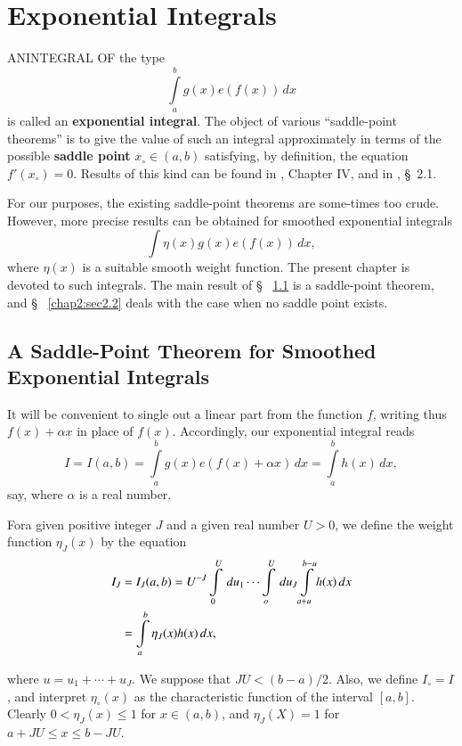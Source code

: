 \chapter{Exponential Integrals}\label{chap2}

AN\pageoriginale INTEGRAL OF the type
$$
\int\limits_a^bg(x)e(f(x))\,dx
$$
is called an {\bf exponential integral}. The object of various
``saddle-point theorems'' is to give the value of such an integral
approximately in terms of the possible {\bf saddle point} $x_\circ
\in(a,b)$ satisfying, by definition, the equation
$f'(x_\circ)=0$. Results of this kind can be found \eg in
\cite{key27}, Chapter IV, and in \cite{key13}, \S~2.1.

For our purposes, the existing saddle-point theorems are some-times
too crude. However, more precise results can be obtained for smoothed
exponential integrals
$$
\int\eta(x)g(x)e(f(x))\,dx,
$$
where $\eta(x)$ is a suitable smooth weight function. The present
chapter is devoted to such integrals. The main result of \S~
\ref{chap2:sec2.1} is a saddle-point theorem, and \S~
\ref{chap2:sec2.2} deals with the case when no saddle point exists.

\section[A Saddle-Point Theorem for]{A Saddle-Point Theorem for
  Smoothed Exponential Integrals}\label{chap2:sec2.1} 

It will be convenient to single out a linear part from the function
$f$, writing thus $f(x)+\alpha x$ in place of $f(x)$. Accordingly, our
exponential integral reads
\begin{equation}\label{chap2:eq2.1.1}
I=I(a,b)=\int\limits_a^b g(x)e(f(x)+\alpha x)\,dx=\int\limits_a^b
h(x)\,dx,
\end{equation}
say, where $\alpha$ is a real number.

For\pageoriginale a given positive integer $J$ and a given real number
$U>0$, we define the weight function $\eta_J(x)$ by the equation
\begin{align}
I_J &= I_J(a,b)=U^{-J}\int\limits_0^U\,du_1\cdots
\int\limits_o^U\,du_J\int\limits_{a+u}^{b-u}h(x)\,dx\label{chap2:eq2.1.2}\\
&= \int\limits_a^b\eta_J(x)h(x)\,dx,\notag
\end{align}

where $u=u_1+\cdots +u_J$. We suppose that $JU<(b-a)/2$. Also, we
define $I_\circ=I$, and interpret $\eta_\circ(x)$ as the
characteristic function of the interval $[a,b]$. Clearly $0<\eta_J
(x)\leq 1$ for $x\in(a,b)$, and $\eta_J(X)=1$ for $a+JU\leq x\leq
b-JU$. 

